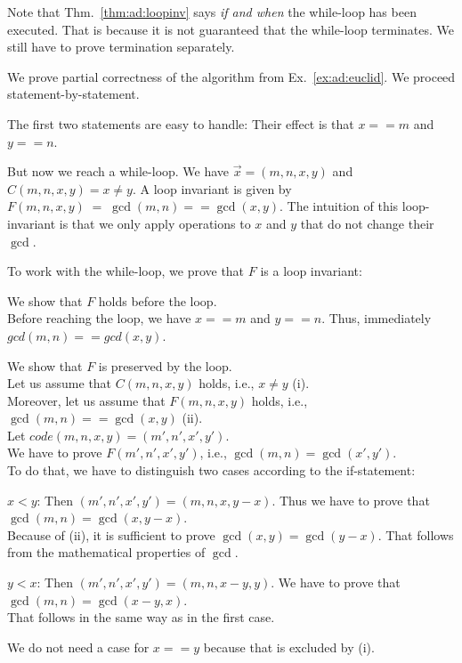 Note that Thm.~\ref{thm:ad:loopinv} says \emph{if and when} the while-loop has been executed.
That is because it is not guaranteed that the while-loop terminates.
We still have to prove termination separately.

\begin{example}\label{ex:ad:euclid:partcorr}
We prove partial correctness of the algorithm from Ex.~\ref{ex:ad:euclid}.
We proceed statement-by-statement.
\medskip

The first two statements are easy to handle: Their effect is that $x==m$ and $y==n$.
\medskip

But now we reach a while-loop.
We have $\vec{x}=(m,n,x,y)$ and $C(m,n,x,y)=x\neq y$.
A loop invariant is given by $F(m,n,x,y)\;=\;\gcd(m,n)==\gcd(x,y)$.
The intuition of this loop-invariant is that we only apply operations to $x$ and $y$ that do not change their $\gcd$.
\medskip

To work with the while-loop, we prove that $F$ is a loop invariant:
\begin{compactitem}
 \item We show that $F$ holds before the loop. \\ Before reaching the loop, we have $x==m$ and $y==n$. Thus, immediately $gcd(m,n)==gcd(x,y)$.
 \item We show that $F$ is preserved by the loop. \\ Let us assume that $C(m,n,x,y)$ holds, i.e., $x\neq y$ (i).\\
  Moreover, let us assume that $F(m,n,x,y)$ holds, i.e., $\gcd(m,n)==\gcd(x,y)$ (ii).\\
  Let $code(m,n,x,y)=(m',n',x',y')$.\\
  We have to prove $F(m',n',x',y')$, i.e., $\gcd(m,n)=\gcd(x',y')$.\\
  To do that, we have to distinguish two cases according to the if-statement:
  \begin{compactitem}
   \item $x<y$: Then $(m',n',x',y') = (m,n,x,y-x)$.
   Thus we have to prove that $\gcd(m,n)=\gcd(x,y-x)$.\\
   Because of (ii), it is sufficient to prove $\gcd(x,y)=\gcd(y-x)$.
   That follows from the mathematical properties of $\gcd$.
   \item $y<x$: Then $(m',n',x',y') = (m,n,x-y,y)$.
   We have to prove that $\gcd(m,n)=\gcd(x-y,x)$.\\
   That follows in the same way as in the first case.
   \item We do not need a case for $x==y$ because that is excluded by (i).
  \end{compactitem}
\end{compactitem}
\medskip


\end{example}
